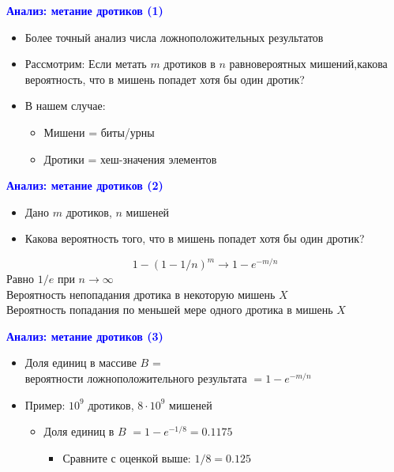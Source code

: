 \documentclass[landscape]{slides}
\begin{document}
\begin{normalsize}
\begin{slide}
\textbf{\textcolor{blue}{Анализ: метание дротиков (1)}}

\begin{itemize}
\item Более точный анализ числа ложноположительных результатов
\item Рассмотрим: Если метать $m$ дротиков в $n$ равновероятных мишений,какова вероятность, что в мишень попадет хотя бы один дротик?
\item В нашем случае:
  \begin{itemize}
  \item Мишени = биты/урны
  \item Дротики = хеш-значения элементов
  \end{itemize}
\end{itemize}
\end{slide}

\begin{slide}
\textbf{\textcolor{blue}{Анализ: метание дротиков (2)}}

\begin{itemize}
\item Дано $m$ дротиков, $n$ мишеней
\item Какова вероятность того, что в мишень попадет хотя бы один дротик?
\end{itemize}
$$ 1 - (1 - 1/n)^m \to 1 - e^{-m/n} $$
Равно $1/e$ при $n\to\infty$\\
Вероятность непопадания дротика в некоторую мишень $X$\\
Вероятность попадания по меньшей мере одного дротика в мишень $X$
\end{slide}

\begin{slide}
\textbf{\textcolor{blue}{Анализ: метание дротиков (3)}}

\begin{itemize}
\item Доля единиц в массиве $B$ = \\
      вероятности ложноположительного результата $=1-e^{-m/n}$
\item Пример: $10^9$ дротиков, $8\cdot 10^9$ мишеней
  \begin{itemize}
  \item Доля единиц в $B$ $=1-e^{-1/8} = 0.1175$
    \begin{itemize}
    \item Сравните с оценкой выше: $1/8 = 0.125$
    \end{itemize}
  \end{itemize}
\end{itemize}
\end{slide}



\end{normalsize}
\end{document}

